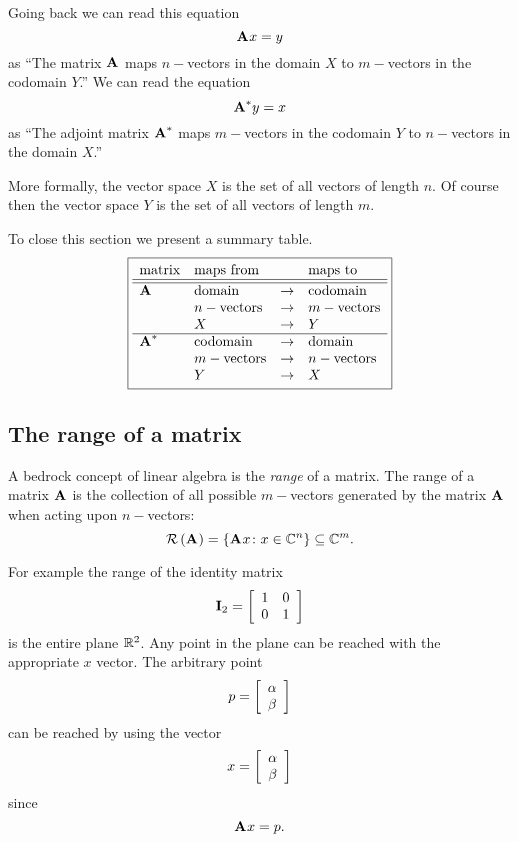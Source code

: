 Going back we can read this equation
\begin{equation*}
  \A{}x=y
\end{equation*}
as ``The matrix $\A{}$ maps $n-$vectors in the domain $X$ to $m-$vectors in the codomain $Y$.''
We can read the equation
\begin{equation*}
  \A{*}y=x
\end{equation*}
as ``The adjoint matrix $\A{*}$ maps $m-$vectors in the codomain $Y$ to $n-$vectors in the domain $X$.''

More formally, the vector space $X$ is the set of all vectors of length $n$. Of course then the vector space $Y$ is the set of all vectors of length $m$.

To close this section we present a summary table.
\begin{equation}
\boxed{
\begin{array}{llcl}
  \text{matrix} & \text{maps from} & & \text{maps to}\\\hline\hline
  \A{} & \text{domain} &\to& \text{codomain}\\
  & n-\text{vectors} &\to& m-\text{vectors}\\
  & X &\to& Y\\ \hline
  \A{*}& \text{codomain} &\to& \text{domain}\\
  & m-\text{vectors} &\to& n-\text{vectors}\\
  & Y &\to& X
\end{array}
}
\end{equation}

\subsection{The range of a matrix}
A bedrock concept of linear algebra is the \textit{range} of a matrix. The range of a matrix $\A{}$ is the collection of all possible $m-$vectors generated by the matrix $\A{}$ when acting upon $n-$vectors:
\begin{equation}
  \rng{\A{}}=\lst{\A{}x\colon x \in \cmplx{n}}\subseteq \cmplx{m}.
\end{equation}

For example the range of the identity matrix
\begin{equation}
  \I{2}=\mat{cc}{1&0\\0&1}
\end{equation}
is the entire plane $\real{2}$. Any point in the plane can be reached with the appropriate $x$ vector. The arbitrary point 
\begin{equation}
  p = \mat{c}{\alpha \\ \beta}
\end{equation}
can be reached by using the vector
\begin{equation}
  x = \mat{c}{\alpha \\ \beta}
\end{equation}
since 
\begin{equation}
  \A{} x = p.
\end{equation}


